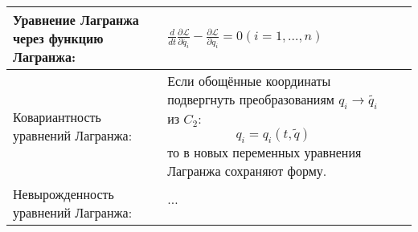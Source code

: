 \documentclass{article}
\begin{document}
\begin{tabular}{ |p{3.8cm}|p{5.7cm}|p{6cm}|p{3.5cm}|  }
                                                                             \\ %
\hline
Уравнение Лагранжа через функцию Лагранжа:                                   &  %
$\frac{d}{dt} \frac{\partial \mathcal{L}}{\partial \dot{q_i}} -
 \frac{\partial \mathcal{L}}{\partial q_i} = 0 (i = 1, \dots, n)$            &  %
                                                                             &  %
                                                                             \\ %
\hline
Ковариантность уравнений Лагранжа:                                           &  %
Если обощённые координаты подвергнуть преобразованиям $q_i \to \tilde{q_i}$
 из $C_2$:
\[q_i = q_i(t, \tilde{q}) \]
то в новых переменных уравнения Лагранжа сохраняют форму.                    &  %
                                                                             &  %
                                                                             \\ %
\hline
Невырожденность уравнений Лагранжа:                                          &  %
$\dots$                                                                      &  %
                                                                             &  %
                                                                             \\ %
\hline
\end{tabular}
\end{document}
